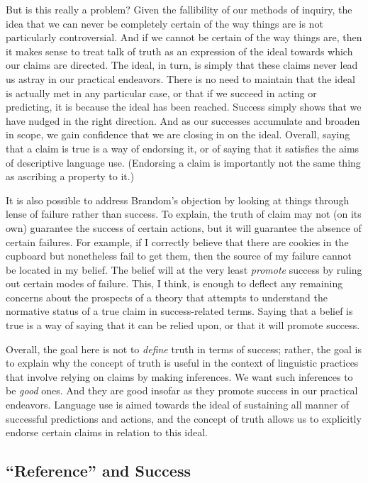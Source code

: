 But is this really a problem? Given the fallibility of our methods of inquiry, the idea that we can never be completely certain of the way things are is not particularly controversial. And if we cannot be certain of the way things are, then it makes sense to treat talk of truth as an expression of the ideal towards which our claims are directed. The ideal, in turn, is simply that these claims never lead us astray in our practical endeavors. There is no need to maintain that the ideal is actually met in any particular case, or that if we succeed in acting or predicting, it is because the ideal has been reached. Success simply shows that we have nudged in the right direction. And as our successes accumulate and broaden in scope, we gain confidence that we are closing in on the ideal. Overall, saying that a claim is true is a way of endorsing it, or of saying that it satisfies the aims of descriptive language use. (Endorsing a claim is importantly not the same thing as ascribing a property to it.) 

It is also possible to address Brandom's objection by looking at things through lense of failure rather than success. To explain, the truth of claim may not (on its own) guarantee the success of certain actions, but it will guarantee the absence of certain failures. For example, if I correctly believe that there are cookies in the cupboard but nonetheless fail to get them, then the source of my failure cannot be located in my belief. The belief will at the very least \textit{promote} success by ruling out certain modes of failure. This, I think, is enough to deflect any remaining concerns about the prospects of a theory that attempts to understand the normative status of a true claim in success-related terms. Saying that a belief is true is a way of saying that it can be relied upon, or that it will promote success.

Overall, the goal here is not to \textit{define} truth in terms of success; rather, the goal is to explain why the concept of truth is useful in the context of linguistic practices that involve relying on claims by making inferences. We want such inferences to be \textit{good} ones. And they are good insofar as they promote success in our practical endeavors. Language use is aimed towards the ideal of sustaining all manner of successful predictions and actions, and the concept of truth allows us to explicitly endorse certain claims in relation to this ideal.

\subsection{``Reference'' and Success}

